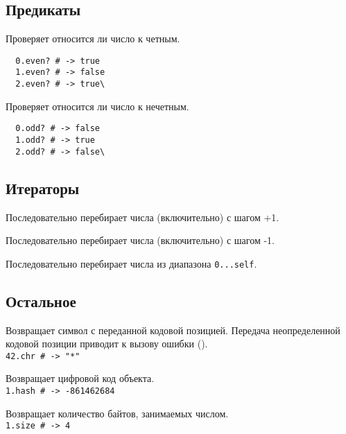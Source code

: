 \subsection*{Предикаты}

\begin{methodlist}
  Проверяет относится ли число к четным.
  \begin{verbatim}
  0.even? # -> true
  1.even? # -> false
  2.even? # -> true\
  \end{verbatim}

  Проверяет относится ли число к нечетным.
  \begin{verbatim}
  0.odd? # -> false
  1.odd? # -> true
  2.odd? # -> false\
  \end{verbatim}
\end{methodlist}

\subsection*{Итераторы}

\begin{methodlist}
  Последовательно перебирает числа (включительно) с шагом +1. 

  Последовательно перебирает числа (включительно) с шагом -1. 

  Последовательно перебирает числа из диапазона \verb!0...self!.
\end{methodlist}

\subsection*{Остальное}

\begin{methodlist}
  Возвращает символ с переданной кодовой позицией. Передача неопределенной кодовой позиции приводит к вызову ошибки ().
  \\\verb!42.chr # -> "*"!

  Возвращает цифровой код объекта.
  \\\verb!1.hash # -> -861462684!

  Возвращает количество байтов, занимаемых числом.
  \\\verb!1.size # -> 4!
\end{methodlist}

